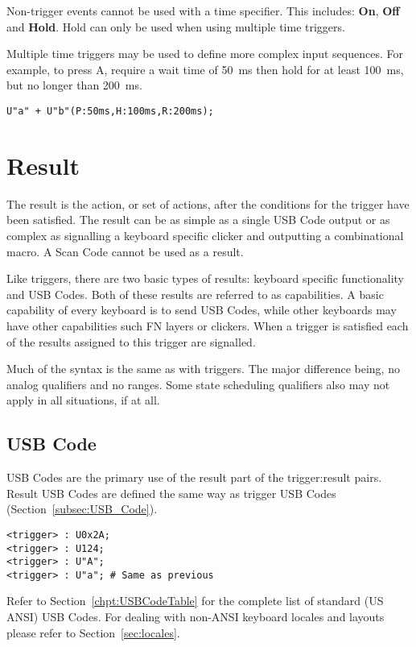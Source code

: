 \documentclass{kiibohd-template}
\begin{document}
Non-trigger events cannot be used with a time specifier.
This includes: \textbf{On}, \textbf{Off} and \textbf{Hold}.
Hold can only be used when using multiple time triggers.

Multiple time triggers may be used to define more complex input sequences.
For example, to press A, require a wait time of 50~ms then hold for at least 100~ms, but no longer than 200~ms.

\begin{lstlisting}
U"a" + U"b"(P:50ms,H:100ms,R:200ms);
\end{lstlisting}


\section{Result}

The result is the action, or set of actions, after the conditions for the trigger have been satisfied.
The result can be as simple as a single USB Code output or as complex as signalling a keyboard specific clicker and outputting a combinational macro.
A Scan Code cannot be used as a result.

Like triggers, there are two basic types of results: keyboard specific functionality and USB Codes.
Both of these results are referred to as capabilities.
A basic capability of every keyboard is to send USB Codes, while other keyboards may have other capabilities such FN layers or clickers.
When a trigger is satisfied each of the results assigned to this trigger are signalled.

Much of the syntax is the same as with triggers.
The major difference being, no analog qualifiers and no ranges.
Some state scheduling qualifiers also may not apply in all situations, if at all.


\subsection{USB Code}

USB Codes are the primary use of the result part of the trigger:result pairs.
Result USB Codes are defined the same way as trigger USB Codes (Section~\ref{subsec:USB_Code}).

\begin{lstlisting}
<trigger> : U0x2A;
<trigger> : U124;
<trigger> : U"A";
<trigger> : U"a"; # Same as previous
\end{lstlisting}

Refer to Section~\ref{chpt:USBCodeTable} for the complete list of standard (US ANSI) USB Codes.
For dealing with non-ANSI keyboard locales and layouts please refer to Section~\ref{sec:locales}.
\end{document}
